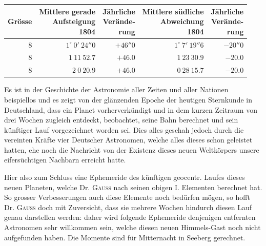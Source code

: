 \begin{center}
\begingroup\fontsize{8}{10}\selectfont\setlength{\tabcolsep}{3pt}\renewcommand{\arraystretch}{1.12}
\begin{tabular}{r|r|r|r|r}
Grösse & \shortstack{Mittlere gerade\\Aufsteigung\\1804} & \shortstack{Jährliche\\Verände-\\rung} & \shortstack{Mittlere südliche\\Abweichung\\1804} & \shortstack{Jährliche\\Verände-\\rung} \\ \hline
$8$ & $1^\circ\ 0'\ 24''0$ & $+46''0$ & $1^\circ\ 7'\ 19''6$ & $-20''0$ \\
$8$ & $1\ 11\ 52.7$ & $+46.0$ & $1\ 23\ 30.9$ & $-20.0$ \\
$8$ & $2\ 0\ 20.9$ & $+46.0$ & $0\ 28\ 15.7$ & $-20.0$ \\
\end{tabular}\endgroup
\end{center}

Es ist in der Geschichte der Astronomie aller Zeiten und aller Nationen beispiellos und es zeigt von der glänzenden Epoche der heutigen Sternkunde in Deutschland, dass ein Planet vorherverkündigt und in dem kurzen Zeitraum von drei Wochen zugleich entdeckt, beobachtet, seine Bahn berechnet und sein künftiger Lauf vorgezeichnet worden sei. Dies alles geschah jedoch durch die vereinten Kräfte vier Deutscher Astronomen, welche alles dieses schon geleistet hatten, ehe noch die Nachricht von der Existenz dieses neuen Weltkörpers unsere eifersüchtigen Nachbarn erreicht hatte.

Hier also zum Schluss eine Ephemeride des künftigen geocentr. Laufes dieses neuen Planeten, welche Dr. \textsc{Gauss} nach seinen obigen I. Elementen berechnet hat. So grosser Verbesserungen auch diese Elemente noch bedürfen mögen, so hofft Dr. \textsc{Gauss} doch mit Zuversicht, dass sie mehrere Wochen hindurch diesen Lauf genau darstellen werden: daher wird folgende Ephemeride denjenigen entfernten Astronomen sehr willkommen sein, welche diesen neuen Himmels-Gast noch nicht aufgefunden haben. Die Momente sind für Mitternacht in Seeberg gerechnet.

